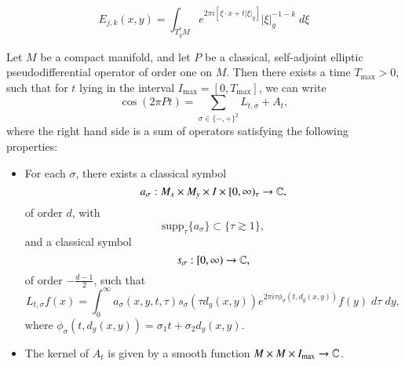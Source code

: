 


%
\[ E_{j,k}(x,y) = \int_{T^*_y M} e^{2 \pi i [\xi \cdot x + t |\xi|_g]} |\xi|_g^{ - 1 - k}\; d\xi \]


\begin{theorem}
    Let $M$ be a compact manifold, and let $P$ be a classical, self-adjoint elliptic pseudodifferential operator of order one on $M$. Then there exists a time $T_{\text{max}} > 0$, such that for $t$ lying in the interval $I_{\text{max}} = [0, T_{\text{max}}]$, we can write
    \[ \cos(2 \pi P t) = \sum_{\sigma \in \{ -, + \}^2 } L_{t,\sigma} + A_t, \]
    where the right hand side is a sum of operators satisfying the following properties:
    \begin{itemize}
        \item For each $\sigma$, there exists a classical symbol
        \[ a_\sigma: M_x \times M_y \times I \times [0,\infty)_\tau \to \operatorname{\mathbb{C}}, \]
        of order $d$, with
        \[ \text{supp}_\tau \{ a_\sigma \} \subset \{ \tau \gtrsim 1 \}, \]
        and a classical symbol
        \[ s_\sigma: [0,\infty) \to \operatorname{\mathbb{C}}, \]
        of order $- \frac{d-1}{2}$, such that
        \[ L_{t,\sigma} f(x) = \int_0^\infty a_\sigma(x,y,t,\tau) s_\sigma(\tau d_g(x,y)) e^{2 \pi i \tau \phi_\sigma(t,d_g(x,y))} f(y)\; d\tau\; dy, \]
        where $\phi_\sigma(t,d_g(x,y)) = \sigma_1 t + \sigma_2 d_g(x,y)$.

        \item The kernel of $A_t$ is given by a smooth function $M \times M \times I_{\text{max}} \to \operatorname{\mathbb{C}}$.
    \end{itemize}
\end{theorem}


